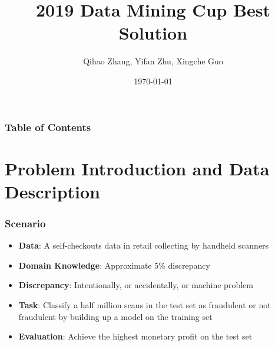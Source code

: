 \documentclass{beamer}
\title[ISU team 2]{%
2019 Data Mining Cup Best Solution}
\author[]{
	Qihao Zhang, Yifan Zhu, Xingche Guo
}
\institute[Dept. of Statistics, ISU]{Department of Statistics, Iowa State University}
\date{\today}
\begin{document}
\begin{frame}
\titlepage
\end{frame}

\begin{frame}
\frametitle{Table of Contents}
\tableofcontents
\end{frame}


\section{Problem Introduction and Data Description}
\begin{frame}
\frametitle{Scenario}
\begin{itemize}
    \item \textbf{Data}: A self-checkouts data in retail collecting by handheld scanners
    \item \textbf{Domain Knowledge}: Approximate 5\% discrepancy
    \item \textbf{Discrepancy}: Intentionally, or accidentally, or machine problem
    \item \textbf{Task}: Classify a half million scans in the test set as fraudulent or not fraudulent by building up a model on the training set
    \item \textbf{Evaluation}: Achieve the highest monetary profit on the test set
    
\end{itemize}
\end{frame}
\end{document}
